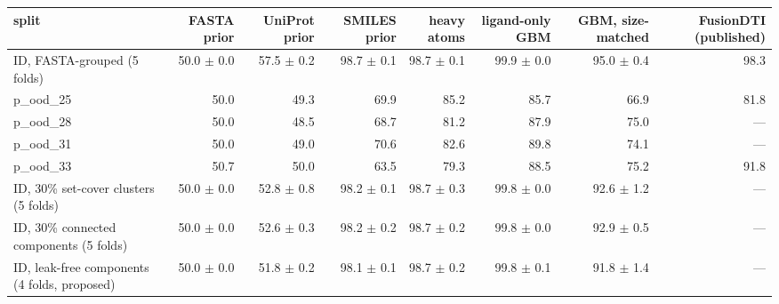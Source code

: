 \begin{tabular}{lrrrrrrr}
\toprule
split & FASTA prior & UniProt prior & SMILES prior & heavy atoms & ligand-only GBM & GBM, size-matched & FusionDTI (published) \\ \midrule
ID, FASTA-grouped (5 folds) & 50.0 $\pm$ 0.0 & 57.5 $\pm$ 0.2 & 98.7 $\pm$ 0.1 & 98.7 $\pm$ 0.1 & 99.9 $\pm$ 0.0 & 95.0 $\pm$ 0.4 & 98.3 \\
p\_ood\_25 & 50.0 & 49.3 & 69.9 & 85.2 & 85.7 & 66.9 & 81.8 \\
p\_ood\_28 & 50.0 & 48.5 & 68.7 & 81.2 & 87.9 & 75.0 & — \\
p\_ood\_31 & 50.0 & 49.0 & 70.6 & 82.6 & 89.8 & 74.1 & — \\
p\_ood\_33 & 50.7 & 50.0 & 63.5 & 79.3 & 88.5 & 75.2 & 91.8 \\
ID, 30\% set-cover clusters (5 folds) & 50.0 $\pm$ 0.0 & 52.8 $\pm$ 0.8 & 98.2 $\pm$ 0.1 & 98.7 $\pm$ 0.3 & 99.8 $\pm$ 0.0 & 92.6 $\pm$ 1.2 & — \\
ID, 30\% connected components (5 folds) & 50.0 $\pm$ 0.0 & 52.6 $\pm$ 0.3 & 98.2 $\pm$ 0.2 & 98.7 $\pm$ 0.2 & 99.8 $\pm$ 0.0 & 92.9 $\pm$ 0.5 & — \\
ID, leak-free components (4 folds, proposed) & 50.0 $\pm$ 0.0 & 51.8 $\pm$ 0.2 & 98.1 $\pm$ 0.1 & 98.7 $\pm$ 0.2 & 99.8 $\pm$ 0.1 & 91.8 $\pm$ 1.4 & — \\
\bottomrule
\end{tabular}
